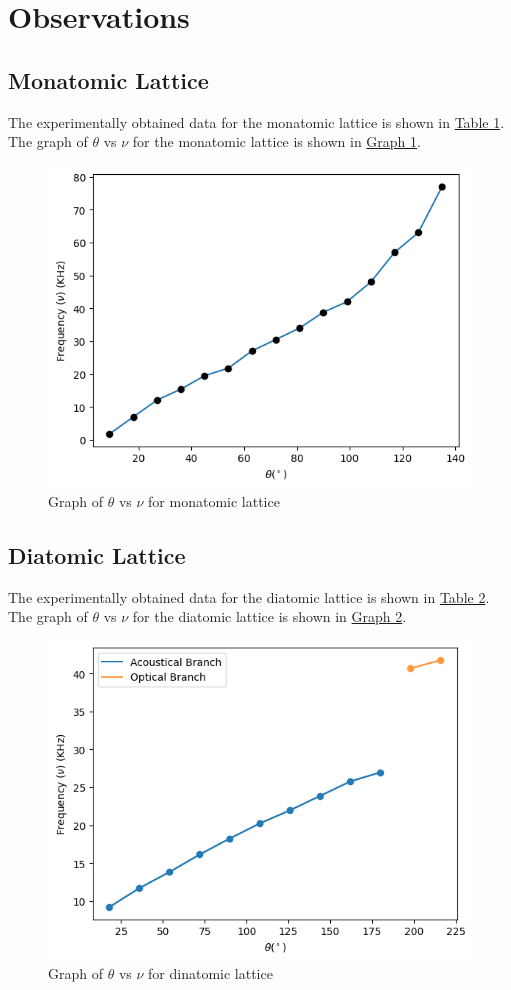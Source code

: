 \section{Observations}

	\subsection{Monatomic Lattice}
		The experimentally obtained data for the monatomic lattice is shown in \hyperref[tab:mono]{Table 1}. The graph of $\theta$ vs $\nu$ for the monatomic lattice is shown in \hyperref[fig:graph1]{Graph 1}.
		

		\begin{figure}[h]
			\centering
			\includegraphics[width=0.9\columnwidth]{images/graph1.png}
			\caption{Graph of $\theta$ vs $\nu$ for monatomic lattice}
			\label{fig:graph1}
		\end{figure}


	\subsection{Diatomic Lattice}
		The experimentally obtained data for the diatomic lattice is shown in \hyperref[tab:di]{Table 2}. The graph of $\theta$ vs $\nu$ for the diatomic lattice is shown in \hyperref[fig:graph2]{Graph 2}.
		

		\begin{figure}[h]
			\centering
			\includegraphics[width=0.9\columnwidth]{images/graph2.png}
			\caption{Graph of $\theta$ vs $\nu$ for dinatomic lattice}
			\label{fig:graph2}
		\end{figure}